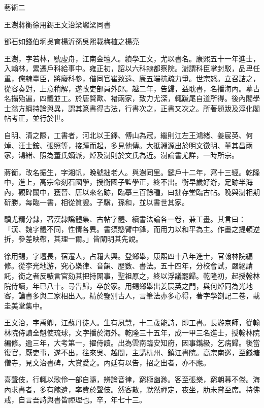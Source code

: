 
\begin{pinyinscope}
藝術二

王澍蔣衡徐用錫王文治梁巘梁同書

鄧石如錢伯坰吳育楊沂孫吳熙載梅植之楊亮

王澍，字若林，號虛舟，江南金壇人。績學工文，尤以書名。康熙五十一年進士，入翰林，累遷戶科給事中。雍正初，詔以六科隸都察院。澍謂科臣掌封駁，品卑任重，儻隸臺臣，將廢科參，偕同官崔致遠、康五端抗疏力爭。世宗怒。立召詰之，從容奏對，上意稍解，遂改吏部員外郎。越二年，告歸，益耽書，名播海內。摹古名搨殆遍，四體並工。於唐賢歐、褚兩家，致力尤深，輒跋尾自道所得。後內閣學士翁方綱持論與異，謂其篆書得古法，行書次之，正書又次之。所著題跋及淳化閣帖考正，並行於世。

自明、清之際，工書者，河北以王鐸、傅山為冠，繼則江左王鴻緒、姜宸英、何焯、汪士鋐、張照等，接踵而起，多見他傳。大抵淵源出於明文徵明、董其昌兩家，鴻緒、照為董氏嫡派，焯及澍則於文氏為近。澍論書尤詳，一時所宗。

蔣衡，改名振生，字湘帆，晚號拙老人。與澍同里。鍵戶十二年，寫十三經。乾隆中，進上，高宗命刻石國學，授衡國子監學正，終不出。衡早歲好游，足跡半海內，觀碑關中，獲晉、唐以來名跡，臨摹三百餘種，曰拙存堂臨古帖。晚與澍相期斫勝，每臨一書，相從質證。子驥，孫和，並以書世其家。

驥尤精分隸，著漢隸譌體集、古帖字體、續書法論各一卷，兼工畫。其言曰：「漢、魏字體不同，性情各異。書須懸臂中鋒，而用力以和平為主。作畫之提頓逆折，參差映帶，其理一爾。」皆闡明其先說。

徐用錫，字壇長，宿遷人，占籍大興。登鄉舉，康熙四十八年進士，官翰林院編修。從李光地游，究心樂律、音韻、歷數、書法。五十四年，分校會試，嚴絕請託，銜之者反嗾言官劾其把持闈事，聖祖原之，終以浮議罷歸。乾隆初，起授翰林院侍讀，年已八十。尋告歸，卒於家。用錫鄉舉出姜宸英之門，與何焯同為光地客，論書多與二家相出入。精於鑒別古人，言筆法亦多心得，著字學劄記二卷，載圭美堂集中。

王文治，字禹卿，江蘇丹徒人。生有夙慧，十二歲能詩，即工書。長游京師，從翰林院侍讀全魁使琉球，文字播於海外。乾隆三十五年，成一甲三名進士，授翰林院編修。逾三年，大考第一，擢侍讀。出為雲南臨安知府，因事鐫級，乞病歸。後當復官，厭吏事，遂不出，往來吳、越間，主講杭州、鎮江書院。高宗南巡，至錢塘僧寺，見文治書碑，大賞愛之。內廷有以告，招之出者，亦不應。

喜聲伎，行輒以歌伶一部自隨，辨論音律，窮極幽渺。客至張樂，窮朝暮不倦。海內求書者，多有餽遺，率費於聲伎。然客散，默然禪定，夜坐，肋未嘗至席。持佛戒，自言吾詩與書皆禪理也。卒，年七十三。


\end{pinyinscope}
